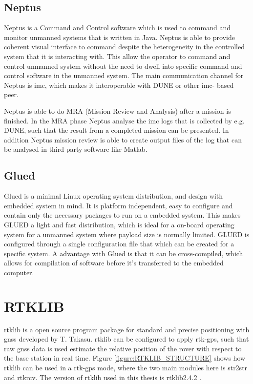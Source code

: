 \subsection{Neptus}
Neptus is a Command and Control software which is used to command and monitor unmanned systems that is written in Java. Neptus is able to provide coherent visual interface to command despite the heterogeneity in the controlled system that it is interacting with.  This allow the operator to command and control unmanned system without the need to dwell into specific command and control software in the unmanned system. The main communication channel for Neptus is \gls{imc}, which makes it interoperable with DUNE or other \gls{imc}- based peer.

Neptus is able to do MRA (Mission Review and Analysis) after a mission is finished. In the MRA phase Neptus analyse the \gls{imc} logs that is collected by e.g. DUNE, such that the result from a completed mission can be presented. In addition Neptus mission review is able to create output files of the log that can be analysed in third party software like Matlab.
\subsection{Glued}
Glued is a minimal Linux operating system distribution, and design with embedded system in mind. It is platform independent, easy to configure and contain only the necessary packages to run on a embedded system. This makes GLUED a light and fast distribution, which is ideal for a on-board operating system for a unmanned system where payload size is normally limited. GLUED is configured through a single configuration file that which can be created for a specific system. A advantage with Glued is that it can be cross-compiled, which allows for compilation of software before it's transferred to the embedded computer.
\section{RTKLIB}\label{ss:Rtklib}
\acrfull{rtklib}\citep{takasu2009development} is a open source program package for standard and precise positioning with \gls{gnss} developed by T. Takasu. \gls{rtklib} can be configured to apply \gls{rtk-gps}, such that raw \gls{gnss} data is used estimate the relative position of the rover with respect to the base station in real time. Figure \ref{figure:RTKLIB_STRUCTURE} shows how \gls{rtklib} can be used in a \gls{rtk-gps} mode, where the two main modules here is str2str and rtkrcv. The version of \gls{rtklib} used in this thesis is \gls{rtklib}2.4.2 \citep{Rtklib242}.


